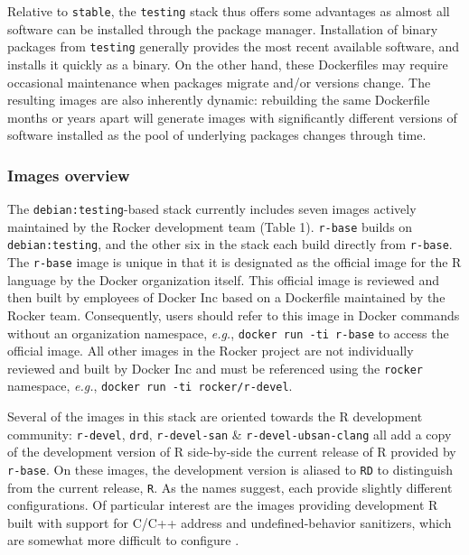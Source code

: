 Relative to \texttt{stable}, the \texttt{testing} stack thus offers some
advantages as almost all software can be installed through the package
manager. Installation of binary packages from \texttt{testing} generally
provides the most recent available software, and installs it quickly as
a binary. On the other hand, these Dockerfiles may require occasional
maintenance when packages migrate and/or versions change. The resulting
images are also inherently dynamic: rebuilding the same Dockerfile
months or years apart will generate images with significantly different
versions of software installed as the pool of underlying packages
changes through time.

\subsubsection{Images overview}\label{images-overview}

The \texttt{debian:testing}-based stack currently includes seven images
actively maintained by the Rocker development team (Table 1).
\texttt{r-base} builds on \texttt{debian:testing}, and the other six in
the stack each build directly from \texttt{r-base}. The \texttt{r-base}
image is unique in that it is designated as the official image for the R
language by the Docker organization itself. This official image is
reviewed and then built by employees of Docker Inc based on a Dockerfile
maintained by the Rocker team. Consequently, users should refer to this
image in Docker commands without an organization namespace, \emph{e.g.},
\texttt{docker\ run\ -ti\ r-base} to access the official image. All
other images in the Rocker project are not individually reviewed and
built by Docker Inc and must be referenced using the \texttt{rocker}
namespace, \emph{e.g.}, \texttt{docker\ run\ -ti\ rocker/r-devel}.

Several of the images in this stack are oriented towards the R
development community: \texttt{r-devel}, \texttt{drd},
\texttt{r-devel-san} \& \texttt{r-devel-ubsan-clang} all add a copy of
the development version of R side-by-side the current release of R
provided by \texttt{r-base}. On these images, the development version is
aliased to \texttt{RD} to distinguish from the current release,
\texttt{R}. As the names suggest, each provide slightly different
configurations. Of particular interest are the images providing
development R built with support for C/C++ address and
undefined-behavior sanitizers, which are somewhat more difficult to
configure \citep{edd_sanitizers}.


